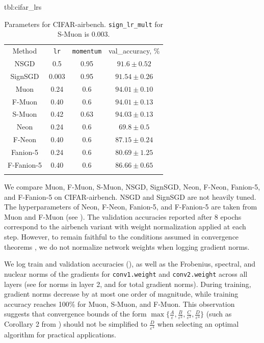 \documentclass[pmlr]{jmlr}%
\renewcommand{\epsilon}{\varepsilon}
\begin{document}
 \begin{table}[htbp]
 \floatconts
   {tbl:cifar_lrs}
   {\caption{Parameters for CIFAR-airbench. \texttt{sign\_lr\_mult} for S-Muon is 0.003.}}
   {%
     \begin{tabular}{cccc}
       \arrayrulecolor{black}\toprule
       Method & \texttt{lr}  & \texttt{momentum}  & val\_accuracy, \% \\
       \arrayrulecolor{black}\hline
       NSGD & 0.5 & 0.95 & $91.6 \pm 0.52$ \\
       \hdashline
       SignSGD & 0.003 & 0.95 & $91.54 \pm 0.26$ \\
       \hdashline
       Muon & 0.24 & 0.6 & $94.01 \pm 0.10$ \\
       F-Muon & 0.40 & 0.6 & $94.01 \pm 0.13$\\
       \hdashline
       S-Muon & 0.42 & 0.63 & $94.03 \pm 0.13$ \\
       \hdashline
       Neon & 0.24 & 0.6 & $69.8 \pm 0.5$ \\
       F-Neon & 0.40 & 0.6 & $87.15 \pm 0.24$\\
       \hdashline
       Fanion-5 & 0.24 & 0.6 & $80.69 \pm 1.25$ \\
       F-Fanion-5 & 0.40 & 0.6 & $86.66 \pm 0.65$\\
       \arrayrulecolor{black}\bottomrule
     \end{tabular}%
   }
 \end{table}
 
 We compare Muon, F-Muon, S-Muon, NSGD, SignSGD, Neon, F-Neon, Fanion-5, and F-Fanion-5 on CIFAR-airbench. NSGD and SignSGD are not heavily tuned. The hyperparameters of Neon, F-Neon, Fanion-5, and F-Fanion-5 are taken from Muon and F-Muon (see ). The validation accuracies reported after 8 epochs correspond to the airbench variant with weight normalization applied at each step. However, to remain faithful to the conditions assumed in convergence theorems \citep{kovalev2025understanding,riabinin2025gluon}, we do not normalize network weights when logging gradient norms.
 
 We log train and validation accuracies (), as well as the Frobenius, spectral, and nuclear norms of the gradients for \texttt{conv1.weight} and \texttt{conv2.weight} across all layers (see  for norms in layer 2, and  for total gradient norms). During training, gradient norms decrease by at most one order of magnitude, while training accuracy reaches 100\% for Muon, S-Muon, and F-Muon. This observation suggests that convergence bounds of the form $\max\{\frac{A}{\epsilon}, \frac{B}{\epsilon^2}, \frac{C}{\epsilon^3}, \frac{D}{\epsilon^4}\}$ (such as Corollary 2 from \citet{kovalev2025understanding}) should not be simplified to $\frac{D}{\epsilon^4}$ when selecting an optimal algorithm for practical applications.
 
\end{document}
